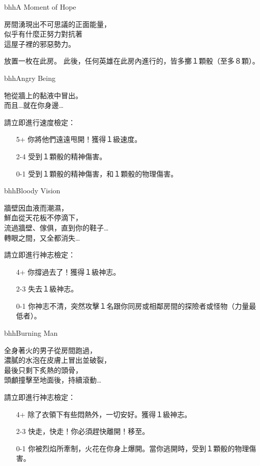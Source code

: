 %
\begin{EventCard}{bhh}{A Moment of Hope}
	\begin{CardStory}
		房間湧現出不可思議的正面能量，\\
		似乎有什麼正努力對抗著\\
		這屋子裡的邪惡勢力。
	\end{CardStory}
	放置一枚在此房。\smallbreak
	此後，任何英雄在此房內進行的，皆多擲１顆骰（至多８顆）。\smallbreak
\end{EventCard}%
\linebreak[0]%
\begin{EventCard}{bhh}{Angry Being}
	\begin{CardStory}
		牠從牆上的黏液中冒出。\\
		而且…就在你身邊…
	\end{CardStory}
	請立即進行速度檢定：
	\begin{itemize}
		\item[5+] 你將他們遠遠甩開！獲得１級速度。
		\item[2-4] 受到１顆骰的精神傷害。
		\item[0-1] 受到１顆骰的精神傷害，和１顆骰的物理傷害。
	\end{itemize}
\end{EventCard}%
\linebreak[0]%
\begin{EventCard}{bhh}{Bloody Vision}
	\begin{CardStory}
		牆壁因血液而潮濕，\\
		鮮血從天花板不停滴下，\\
		流過牆壁、傢俱，直到你的鞋子…\\
		轉眼之間，又全都消失…
	\end{CardStory}
	請立即進行神志檢定：
	\begin{itemize}
		\item[4+] 你撐過去了！獲得１級神志。
		\item[2-3] 失去１級神志。
		\item[0-1] 你神志不清，突然攻擊１名跟你同房或相鄰房間的探險者或怪物（力量最低者）。
	\end{itemize}
\end{EventCard}%
\linebreak[0]%
\begin{EventCard}{bhh}{Burning Man}
	\begin{CardStory}
		全身著火的男子從房間跑過，\\
		濃膩的水泡在皮膚上冒出並破裂，\\
		最後只剩下炙熱的頭骨，\\
		頭顱撞擊至地面後，持續滾動…
	\end{CardStory}
	請立即進行神志檢定：
	\begin{itemize}
		\item[4+] 除了衣領下有些悶熱外，一切安好。獲得１級神志。
		\item[2-3] 快走，快走！你必須趕快離開！移至。
		\item[0-1] 你被烈焰所牽制，火花在你身上爆開。當你逃開時，受到１顆骰的物理傷害。
	\end{itemize}
\end{EventCard}%
